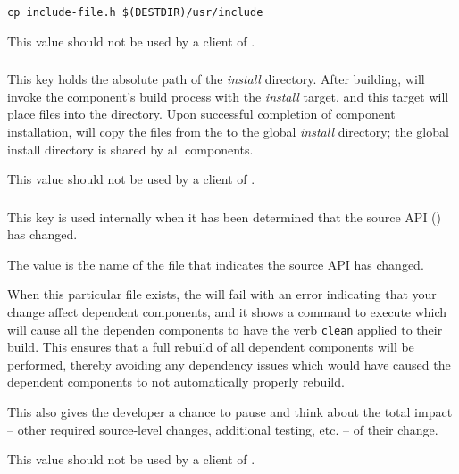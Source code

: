 \begin{verbatim}
cp include-file.h $(DESTDIR)/usr/include
\end{verbatim}

This value should not be used by a client of \lmsbw.

\subsubsection{}

This key holds the absolute path of the \emph{install} directory.
After building, \lmsbw will invoke the component's build process with
the \emph{install} target, and this target will place files into the
\destdir directory.  Upon successful completion of component
installation, \lmsbw will copy the files from the \destdir to the
global \emph{install} directory; the global install directory is
shared by all components.

This value should not be used by a client of \lmsbw.

\subsubsection{}

This key is used internally when it has been determined that the
source API () has changed.

The value is the name of the file that indicates the source API has
changed.

When this particular file exists, the \lmsbw will fail with an error
indicating that your change affect dependent components, and it shows
a command to execute which will cause all the dependen components to
have the verb \texttt{clean} applied to their build.  This ensures
that a full rebuild of all dependent components will be performed,
thereby avoiding any dependency issues which would have caused the
dependent components to not automatically properly rebuild.

This also gives the developer a chance to pause and think about the
total impact -- other required source-level changes, additional
testing, etc. -- of their change.

This value should not be used by a client of \lmsbw.

\subsubsection{}

